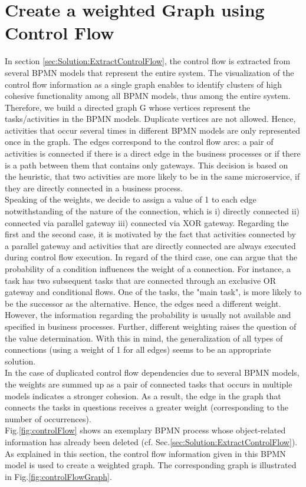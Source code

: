 \section{Create a weighted Graph using Control Flow}
\label{sec:Solution:CreateGraphControl}
In section \ref{sec:Solution:ExtractControlFlow}, the control flow is extracted from several BPMN models that represent the entire system.
The visualization of the control flow information as a single graph enables to identify clusters of high cohesive functionality among all BPMN models, thus among the entire system. 
Therefore, we build a directed graph G whose vertices represent the tasks/activities in the BPMN models. Duplicate vertices are not allowed. Hence, activities that occur several times in different BPMN models are only represented once in the graph.
The edges correspond to the control flow arcs: a pair of activities is connected if there is a direct edge in the business processes or if there is a path between them that contains only gateways. This decision is based on the heuristic, that two activities are more likely to be in the same microservice, if they are directly connected in a business process. \\
Speaking of the weights, we decide to assign a value of 1 to each edge notwithstanding of the nature of the connection, which is i) directly connected ii) connected via parallel gateway iii) connected via XOR gateway. Regarding the first and the second case, it is motivated by the fact that activities connected by a parallel gateway and activities that are directly connected are always executed during control flow execution.
In regard of the third case, one can argue that the probability of a condition influences the weight of a connection. For instance, a task has two subsequent tasks that are connected through an exclusive OR gateway and conditional flows. One of the tasks, the "main task", is more likely to be the successor as the alternative. Hence, the edges need a different weight. However, the information regarding the probability is usually not available and specified in business processes. Further, different weighting raises the question of the value determination. With this in mind, the generalization of all types of connections (using a weight of 1 for all edges) seems to be an appropriate solution. \\
In the case of duplicated control flow dependencies due to several BPMN models, the weights are summed up as a pair of connected tasks that occurs in multiple models indicates a stronger cohesion. As a result, the edge in the graph that connects the tasks in questions receives a greater weight (corresponding to the number of occurrences).\\
Fig.\ref{fig:controlFlow} shows an exemplary BPMN process whose object-related information has already been deleted (cf. Sec.\ref{sec:Solution:ExtractControlFlow}). As explained in this section, the control flow information given in this BPMN model is used to create a weighted graph. The corresponding graph is illustrated in Fig.\ref{fig:controlFlowGraph}. 


